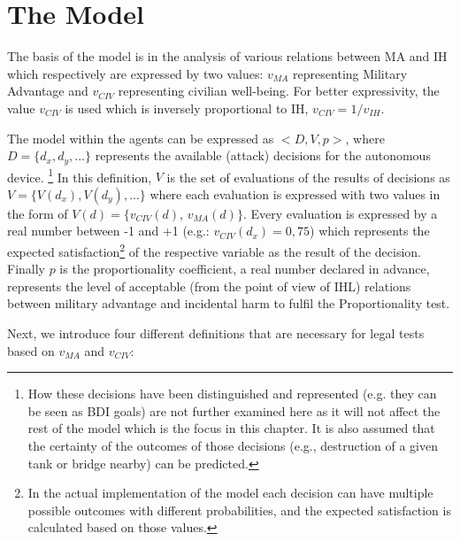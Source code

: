 \section{The Model}

The basis of the model is in the analysis of various relations between MA and IH which respectively are expressed by two values: $v_{MA}$ representing Military Advantage and $v_{CIV}$ representing civilian well-being. For better expressivity, the value $v_{CIV}$ is used which is inversely proportional to IH, $v_{CIV} = 1/v_{IH}$.

The model within the agents can be expressed as $<D,V,p>$, where $D = \{d_x, d_y, ...\}$ represents the available (attack) decisions for the autonomous device. \footnote{How these decisions have been distinguished and represented (e.g. they can be seen as BDI goals) are not further examined here as it will not affect the rest of the model which is the focus in this chapter. It is also assumed that the certainty of the outcomes of those decisions (e.g., destruction of a given tank or bridge nearby) can be predicted.} In this definition, $V$ is the set of evaluations of the results of decisions as $V=\{V(d_x),V(d_y),...\}$ where each evaluation is expressed with two values in the form of $V(d)=\{v_{CIV}(d)$, $v_{MA}(d)\}$. Every evaluation is expressed by a real number between -1 and +1 (e.g.: $v_{CIV}(d_x) = 0,75$) which represents the expected satisfaction\footnote{In the actual implementation of the model each decision can have multiple possible outcomes with different probabilities, and the expected satisfaction is calculated based on those values.} of the respective variable as the result of the decision. Finally $p$ is the proportionality coefficient, a real number declared in advance, represents the level of acceptable (from the point of view of IHL) relations between military advantage and incidental harm to fulfil the Proportionality test.

Next, we introduce four different definitions that are necessary for legal tests based  on $v_{MA}$ and $v_{CIV}$:

